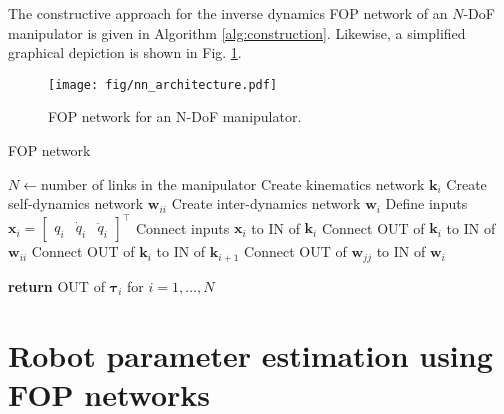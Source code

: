 The constructive approach for the inverse dynamics FOP network of an $N$-DoF manipulator is given in Algorithm \ref{alg:construction}. Likewise, a simplified graphical depiction is shown in Fig. \ref{fig:NN_rep}. 
\begin{figure}[t!]
    \centering
    \texttt{[image: fig/nn\_architecture.pdf]}    
\par
    \caption{FOP network for an N-DoF manipulator.}
    \label{fig:NN_rep}
\end{figure}
\begin{algorithm}
\caption{FOP network}\label{alg:construction}
\begin{algorithmic}[1]
\State $N\gets$number of links in the manipulator
	\State Create kinematics network $\bm{k}_i$
	\State Create self-dynamics network $\bm{w}_{ii}$
	\State Create inter-dynamics network $\bm{w}_i$
	\State Define inputs $\bm{x}_i = \begin{bmatrix} q_i &\dot{q}_i & \ddot{q}_i \end{bmatrix}^\intercal$
\EndFor
	\State Connect inputs $\bm{x}_i$ to IN of $\bm{k}_i$
	\State Connect OUT of $\bm{k}_i$ to IN of $\bm{w}_{ii}$
\EndFor
{}%
	\State Connect OUT of $\bm{k}_i$ to IN of $\bm{k}_{i+1}$
\EndFor
{}
		\State Connect OUT of $\bm{w}_{jj}$ to IN of $\bm{w}_i$
	\EndFor
\EndFor

\State \textbf{return} OUT of $\bm{\tau}_i$ for $i=1,\ldots,N$ 
\EndProcedure
\end{algorithmic}
\end{algorithm}
\section{Robot parameter estimation using FOP networks}\label{sec:param_est}

